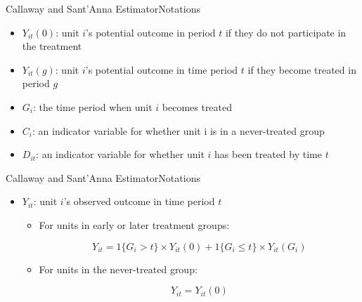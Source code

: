 \documentclass[dvipsnames,hyperref={pdfpagelabels=false}]{beamer}
\begin{document}
\begin{frame}{Callaway and Sant'Anna Estimator}{Notations}
	\begin{itemize}
	
			\item $Y_{it}(0)$: unit $i$'s potential outcome in period $t$ if they do not participate in the treatment
			\vspace{0.2cm}
			\item $Y_{it}(g)$:	unit $i$'s potential outcome in time period $t$
			if they become treated in period $g$
			\vspace{0.2cm}
				\item $G_{i}$: the time period when unit $i$ becomes treated 
		\vspace{0.2cm}				
		\item $C_{i}$: an indicator variable for whether unit i
		is in a never-treated group
		\vspace{0.2cm}
		\item 	$D_{it}$: an indicator variable for whether unit $i$
		has been treated by time $t$
			
		\end{itemize}
		


\end{frame}





\begin{frame}{Callaway and Sant'Anna Estimator}{Notations}
	\begin{itemize}
	

		\item 	$Y_{it}$: unit $i$'s observed outcome in time period  $t$	 		
			\vspace{0.2cm}
		\begin{itemize}	
		\item For units in early or later treatment groups:
			
		\begin{equation*}
			Y_{it} = 1\{G_i>t\} \times Y_{it}(0)+1\{G_i \leq t\} \times Y_{it}(G_{i})
		\end{equation*}
						\end{itemize}
		
			\vspace{0.2cm}
		\begin{itemize}	
			\item For units in the never-treated group:
			
			\begin{equation*}
				Y_{it} = Y_{it}(0)
			\end{equation*}
		\end{itemize}
		
			
		\end{itemize}

	
\end{frame}
\end{document}
